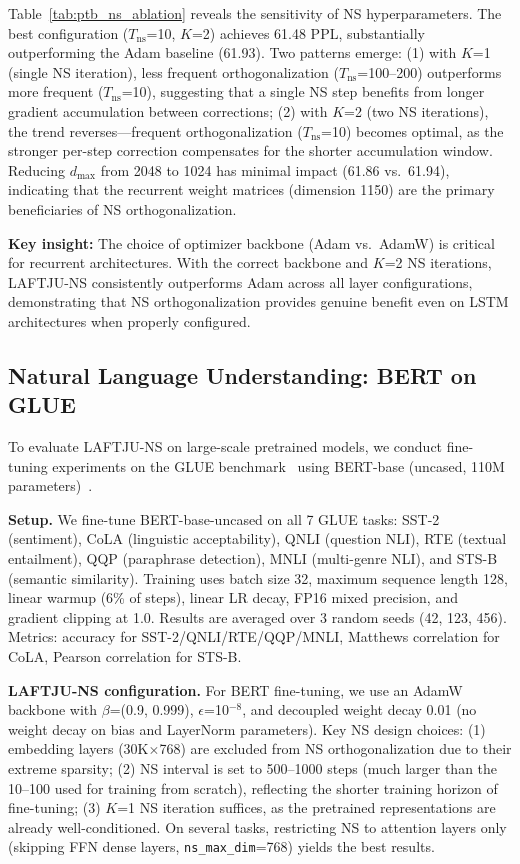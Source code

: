 \documentclass[10pt,twocolumn]{article}
\newcommand{\method}{LAFTJU}
\begin{document}
Table~\ref{tab:ptb_ns_ablation} reveals the sensitivity of NS hyperparameters. The best configuration ($T_\mathrm{ns}$=10, $K$=2) achieves 61.48 PPL, substantially outperforming the Adam baseline (61.93). Two patterns emerge: (1) with $K$=1 (single NS iteration), less frequent orthogonalization ($T_\mathrm{ns}$=100--200) outperforms more frequent ($T_\mathrm{ns}$=10), suggesting that a single NS step benefits from longer gradient accumulation between corrections; (2) with $K$=2 (two NS iterations), the trend reverses---frequent orthogonalization ($T_\mathrm{ns}$=10) becomes optimal, as the stronger per-step correction compensates for the shorter accumulation window. Reducing $d_\mathrm{max}$ from 2048 to 1024 has minimal impact (61.86 vs.\ 61.94), indicating that the recurrent weight matrices (dimension 1150) are the primary beneficiaries of NS orthogonalization.

\textbf{Key insight:} The choice of optimizer backbone (Adam vs.\ AdamW) is critical for recurrent architectures. With the correct backbone and $K$=2 NS iterations, \method{}-NS consistently outperforms Adam across all layer configurations, demonstrating that NS orthogonalization provides genuine benefit even on LSTM architectures when properly configured.

\subsection{Natural Language Understanding: BERT on GLUE}
\label{sec:bert_glue}

To evaluate \method{}-NS on large-scale pretrained models, we conduct fine-tuning experiments on the GLUE benchmark~\cite{glue} using BERT-base (uncased, 110M parameters)~\cite{bert}.

\textbf{Setup.} We fine-tune BERT-base-uncased on all 7 GLUE tasks: SST-2 (sentiment), CoLA (linguistic acceptability), QNLI (question NLI), RTE (textual entailment), QQP (paraphrase detection), MNLI (multi-genre NLI), and STS-B (semantic similarity). Training uses batch size 32, maximum sequence length 128, linear warmup (6\% of steps), linear LR decay, FP16 mixed precision, and gradient clipping at 1.0. Results are averaged over 3 random seeds (42, 123, 456). Metrics: accuracy for SST-2/QNLI/RTE/QQP/MNLI, Matthews correlation for CoLA, Pearson correlation for STS-B.

\textbf{\method{}-NS configuration.} For BERT fine-tuning, we use an AdamW backbone with $\beta$=(0.9, 0.999), $\epsilon$=10$^{-8}$, and decoupled weight decay 0.01 (no weight decay on bias and LayerNorm parameters). Key NS design choices: (1) embedding layers (30K$\times$768) are excluded from NS orthogonalization due to their extreme sparsity; (2) NS interval is set to 500--1000 steps (much larger than the 10--100 used for training from scratch), reflecting the shorter training horizon of fine-tuning; (3) $K$=1 NS iteration suffices, as the pretrained representations are already well-conditioned. On several tasks, restricting NS to attention layers only (skipping FFN dense layers, \texttt{ns\_max\_dim}=768) yields the best results.
\end{document}
